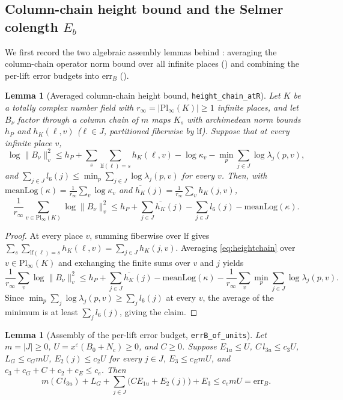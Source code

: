 \documentclass[11pt]{amsart}
\newcommand{\eps}{\varepsilon}
\theoremstyle{plain}
\newtheorem{lemma}[theorem]{Lemma}
\theoremstyle{definition}
\numberwithin{equation}{section}
\begin{document}
\subsection{Column-chain height bound and the Selmer colength \texorpdfstring{$E_b$}{Eb}}

We first record the two algebraic assembly lemmas behind : averaging the
column-chain operator norm bound over all infinite places () and combining
the per-lift error budgets into $\mathrm{err}_B$ ().

\begin{lemma}[Averaged column-chain height bound, \texttt{height\_chain\_atR}]\label{lem:heightchain}
Let $K$ be a totally complex number field with $r_\infty=|\mathrm{Pl}_\infty(K)|\ge1$ infinite
places, and let $B_\nu$ factor through a column chain of $m$ maps $K_s$ with archimedean norm
bounds $h_P$ and $h_K(\ell,v)$ ($\ell\in J$, partitioned fiberwise by $\mathrm{lf}$). Suppose that
at every infinite place $v$,
\begin{equation}\label{eq:heightchain}
\log\|B_\nu\|_v^2 \le h_P + \sum_s\sum_{\mathrm{lf}(\ell)=s} h_K(\ell,v) - \log\kappa_v -
\min_p\sum_{j\in J}\log\lambda_j(p,v),
\end{equation}
and $\sum_{j\in J} l_6(j)\le\min_p\sum_{j\in J}\log\lambda_j(p,v)$ for every $v$. Then, with
$\mathrm{meanLog}(\kappa)=\frac{1}{r_\infty}\sum_v\log\kappa_v$ and
$\overline{h_K}(j)=\frac{1}{r_\infty}\sum_v h_K(j,v)$,
\[
\frac{1}{r_\infty}\sum_{v\in\mathrm{Pl}_\infty(K)}\log\|B_\nu\|_v^2
\le h_P + \sum_{j\in J}\overline{h_K}(j) - \sum_{j\in J} l_6(j) - \mathrm{meanLog}(\kappa).
\]
\end{lemma}

\begin{proof}
At every place $v$, summing fiberwise over $\mathrm{lf}$ gives
$\sum_s\sum_{\mathrm{lf}(\ell)=s} h_K(\ell,v)=\sum_{j\in J} h_K(j,v)$. Averaging
\eqref{eq:heightchain} over $v\in\mathrm{Pl}_\infty(K)$ and exchanging the finite sums over $v$ and
$j$ yields
\[
\frac{1}{r_\infty}\sum_v\log\|B_\nu\|_v^2\le h_P+\sum_{j\in J}\overline{h_K}(j)-\mathrm{meanLog}(\kappa)
-\frac{1}{r_\infty}\sum_v\min_p\sum_{j\in J}\log\lambda_j(p,v).
\]
Since $\min_p\sum_j\log\lambda_j(p,v)\ge\sum_j l_6(j)$ at every $v$, the average of the minimum is
at least $\sum_j l_6(j)$, giving the claim.
\end{proof}

\begin{lemma}[Assembly of the per-lift error budget, \texttt{errB\_of\_units}]\label{lem:errBunits}
Let $m=|J|\ge0$, $U=x^\eps(B_0+N_c)\ge0$, and $C\ge0$. Suppose $E_{1u}\le U$,
$C\,l_{3u}\le c_3 U$, $L_G\le c_G mU$, $E_2(j)\le c_2 U$ for every $j\in J$, $E_3\le c_E mU$, and
$c_3+c_G+C+c_2+c_E\le c_e$. Then
\[
m(C\,l_{3u})+L_G+\sum_{j\in J}\bigl(C E_{1u}+E_2(j)\bigr)+E_3\le c_e m U=\mathrm{err}_B.
\]
\end{lemma}
\end{document}
